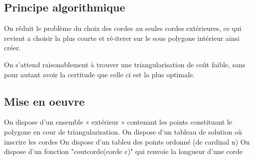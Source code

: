 \documentclass[a4paper,10pt]{article}
\begin{document}
\subsection{Principe algorithmique}

On réduit le problème du choix des cordes au seules cordes extérieures, ce qui revient a choisir la plus courte et ré-iterer sur le sous polygone intérieur ainsi créer.

On s'attend raisonablement à trouver une triangularisation de coût faible, sans pour autant avoir la certitude que celle ci est la plus optimale.

\subsection{Mise en oeuvre}
 

On dispose d'un ensemble « extérieur » contenant les points constituant le polygone en cour de triangularisation.
On dispose d'un tableau de solution où inscrire les cordes
On dispose d'un tableu des points ordonné (de cardinal n)
On dispose d'un fonction "coutcorde(corde c)" qui renvoie la longueur d'une corde
 
 
 
\end{document}
